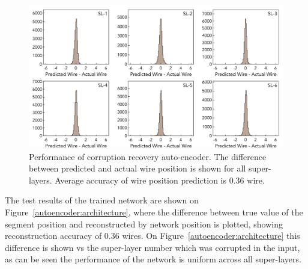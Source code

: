  \begin{figure}[!ht]
\begin{center}
\includegraphics[width=6.0in]{images/encoder_performance.pdf}
\caption {Performance of corruption recovery auto-encoder. The difference between predicted and actual wire position 
is shown for all super-layers. Average accuracy of wire position prediction is  $0.36$ wire.}
 \label{autoencoder:performance}
 \end{center}
\end{figure}
The test results of the trained network are shown on Figure~\ref{autoencoder:architecture}, where the difference between true value 
of the segment position and reconstructed by network position is plotted, showing reconstruction accuracy of $0.36$ wires.
On Figure~\ref{autoencoder:architecture} this difference is shown vs the super-layer number which was corrupted in the input, 
as can be seen the performance of the network is uniform across all super-layers.




